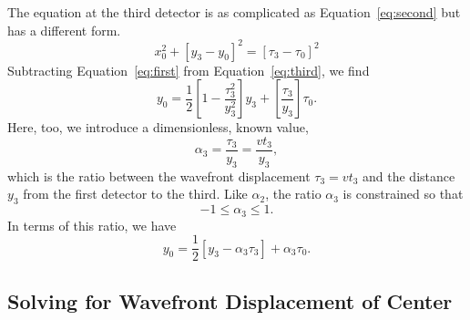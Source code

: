 \documentclass[twocolumn]{article}
\begin{document}
The equation at the third detector is as complicated as
Equation~\ref{eq:second} but has a different form.
\begin{equation}
   x_0^2 + \left[y_3 - y_0\right]^2 = \left[\tau_3 - \tau_0\right]^2
   \label{eq:third}
\end{equation}
Subtracting Equation~\ref{eq:first} from Equation~\ref{eq:third}, we find
\begin{equation}
   y_0 = \frac{1}{2}\left[1 - \frac{\tau_3^2}{y_3^2}\right] y_3 +
         \left[\frac{\tau_3}{y_3}\right] \tau_0.
\end{equation}
Here, too, we introduce a dimensionless, known value,
\begin{equation}
   \alpha_3 = \frac{\tau_3}{y_3} = \frac{v t_3}{y_3},
\end{equation}
which is the ratio between the wavefront displacement $\tau_3 = vt_3$ and the
distance $y_3$ from the first detector to the third.  Like $\alpha_2$, the
ratio $\alpha_3$ is constrained so that
\begin{equation}
   -1 \leq \alpha_3 \leq 1.
\end{equation}
In terms of this ratio, we have
\begin{equation}
   y_0 = \frac{1}{2}\left[y_3 - \alpha_3\tau_3\right] + \alpha_3\tau_0.
   \label{eq:t-y}
\end{equation}

\subsection{Solving for Wavefront Displacement of Center}
\end{document}
